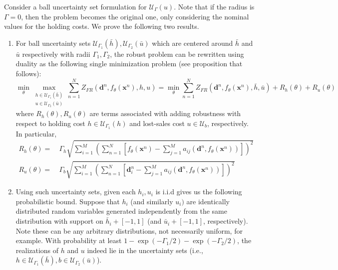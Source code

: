 \documentclass[poms,final,blindrev]{poms1_V1} %
\newcommand{\paren}[1]{\left( #1 \right)}
\newcommand{\x}[0]{{\mathbf{x}}}
\renewcommand{\d}[0]{{\mathbf{d}}}
\begin{document}
\begin{proposition}
\label{prop}
Consider a ball uncertainty set formulation for $\mathcal{U}_{\Gamma}(u)$. Note that if the radius is $\Gamma = 0$, then the problem becomes the original one, only considering the nominal values for the holding costs. We prove the following two results.
\begin{enumerate}
\item 
For ball uncertainty sets $\mathcal{U}_{\Gamma_1}(\bar{h}), \mathcal{U}_{\Gamma_2}(\bar{u})$ which are centered around $\bar{h}$ and $\bar{u}$ respectively with radii $\Gamma_1, \Gamma_2$, the robust problem can be rewritten using duality as the following single minimization problem (see proposition that follows):
\begin{equation}
\label{eq:robust-e2e}
\min_{\theta} \max_{\substack{h \in \mathcal{U}_{\Gamma_1}(\bar{h}) \\ u \in \mathcal{U}_{\Gamma_2}(\bar{u})}}  \sum_{n=1}^N Z_{FR}(\d^n, f_\theta(\x^n), h, u) = 
    \min_\theta \sum_{n=1}^N  Z_{FR}(\d^n, f_\theta(\x^n), \bar{h}, \bar{u}) + R_h(\theta) + R_u(\theta)    
\end{equation}
where $R_h(\theta), R_u(\theta)$ are terms associated with adding robustness with respect to holding cost $h \in \mathcal{U}_{\Gamma_1}(h)$ and lost-sales cost $u \in \mathcal{U}_{b}$, respectively. In particular, 
\begin{align}
R_h(\theta) =&\  \Gamma_h  \sqrt{ \sum_{i=1}^M \left( \sum_{n=1}^N \left[ f_\theta(\x^n) - \sum_{j=1}^M a_{ij}(\d^n, f_\theta(\x^n))\right] \right)^2 } \\
R_u(\theta) =&\  \Gamma_b \sqrt{ \sum_{i=1}^M \left( \sum_{n=1}^N \left[ \d_i^n - \sum_{j=1}^M {a_{ij}(\d^n, f_{\theta}(\x^n))} \right] \right)^2 }
\end{align}


\item 
Using such uncertainty sets, given each $h_i, u_i$ is i.i.d gives us the following probabilistic bound. Suppose that $h_i$ (and similarly $u_i)$ are identically distributed random variables generated independently from the same distribution with support on $\bar{h}_i + [-1,1]$ (and $\bar{u}_i + [-1,1]$, respectively). Note these can be any arbitrary distributions, not necessarily uniform, for example. With probability at least $1 - \exp\paren{-\Gamma_1/2} - \exp\paren{-\Gamma_2/2}$, the realizations of $h$ and $u$ indeed lie in the uncertainty sets (i.e., $h \in \mathcal{U}_{\Gamma_1}(\bar{h}), b \in\mathcal{U}_{\Gamma_2}(\bar{u})$).
\end{enumerate}
\end{proposition}
\end{document}

